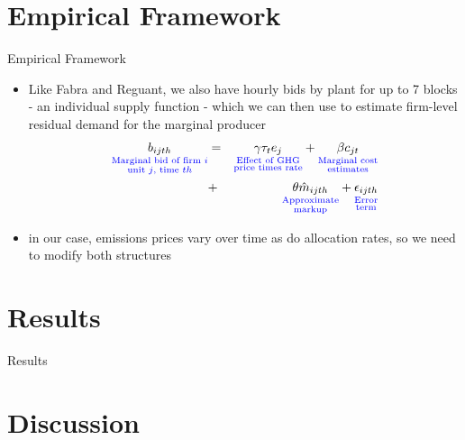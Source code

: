 \documentclass{beamer}
\renewcommand{\(}{\begin{columns}}
\renewcommand{\)}{\end{columns}}
\newcommand{\<}[1]{\begin{column}{#1}}
\renewcommand{\>}{\end{column}}
\begin{document}
\section{Empirical Framework}
\begin{frame}{Empirical Framework}
    \begin{block}{}
    \begin{itemize}
    \item Like Fabra and Reguant, we also have hourly bids by plant for up to 7 blocks - an individual supply function - which we can then use to estimate firm-level residual demand for the marginal producer
    \begin{eqnarray*}\label{eq:production}
    \underset{\color{blue}\substack{\text{Marginal bid of firm $i$}\\{\text{unit $j$, time $th$}}}} {b_{ijth}} &=&\underset{\color{blue}\substack{\text{Effect of GHG}\\{\text{price times rate}}}} {\gamma\tau_te_{j}}
    +\underset{\color{blue}\substack{\text{Marginal cost}\\{\text{estimates}}}} {\beta c_{jt}}\\&+&
    \underset{\color{blue}\substack{\text{Approximate}\\{\text{markup}}}}{\theta\hat{m}_{ijth}}
    + \underset{\color{blue}\substack{\text{Error}\\{\text{term}}}}{\epsilon_{ijth}}
    \end{eqnarray*}
\item in our case, emissions prices vary over time as do allocation rates, so we need to modify both structures
    \end{itemize}
  \end{block}
   \vfill
\end{frame}



\section{Results}

\begin{frame}{Results}
   \vfill
\end{frame}


\section{Discussion}
\end{document}
